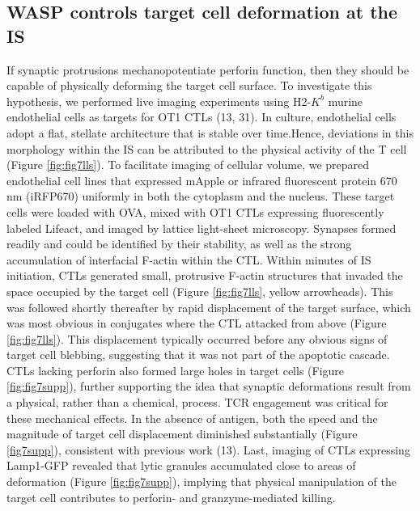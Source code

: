 \subsection{WASP controls target cell deformation at the IS}
If synaptic protrusions mechanopotentiate perforin function, then they should be capable of physically deforming the target cell surface. To investigate this hypothesis, we performed live imaging experiments using H2-$K^{b}$ murine endothelial cells as targets for OT1 CTLs (13, 31). In culture, endothelial cells adopt a flat, stellate architecture that is stable over time.Hence, deviations in this morphology within the IS can be attributed to the physical activity of the T cell (Figure \ref{fig:fig7lls}). To facilitate imaging of cellular volume, we prepared endothelial cell lines that expressed mApple or infrared fluorescent protein 670 nm (iRFP670) uniformly in both the cytoplasm and the nucleus. These target cells were loaded with OVA, mixed with OT1 CTLs expressing fluorescently labeled Lifeact, and imaged by lattice light-sheet microscopy. Synapses formed readily and could be identified by their stability, as well as the strong accumulation of interfacial F-actin within the CTL. Within minutes of IS initiation, CTLs generated small, protrusive F-actin structures that invaded the space occupied by the target cell (Figure \ref{fig:fig7lls}, yellow arrowheads). This was followed shortly thereafter by rapid displacement of the target surface, which was most obvious in conjugates where the CTL attacked from above (Figure \ref{fig:fig7lls}). This displacement typically occurred before any obvious signs of target cell blebbing, suggesting that it was not part of the apoptotic cascade. CTLs lacking perforin also formed large holes in target cells (Figure \ref{fig:fig7supp}), further supporting the idea that synaptic deformations result from a physical, rather than a chemical, process. TCR engagement was critical for these mechanical effects. In the absence of antigen, both the speed and the magnitude of target cell displacement diminished substantially (Figure \ref{fig7supp}), consistent with previous work (13). Last, imaging of CTLs expressing Lamp1-GFP revealed that lytic granules accumulated close to areas of deformation (Figure \ref{fig:fig7supp}), implying that physical manipulation of the target cell contributes to perforin- and granzyme-mediated killing.

